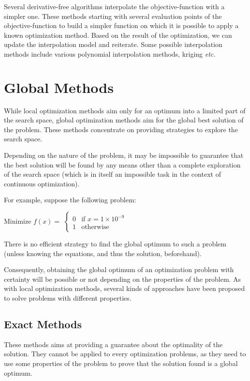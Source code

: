 Several derivative-free algorithms interpolate the objective-function with a simpler one. These methods starting with several evaluation points of the objective-function to build a simpler function on which it is possible to apply a known optimization method. Based on the result of the optimization, we can update the interpolation model and reiterate. Some possible interpolation methods include various polynomial interpolation methods, kriging \emph{etc.}

\section{Global Methods}

While local optimization methods aim only for an optimum into a limited part of the search space, global optimization methods aim for the global best solution of the problem. These methods concentrate on providing strategies to explore the search space.

Depending on the nature of the problem, it may be impossible to guarantee that the best solution will be found by any means other than a complete exploration of the search space (which is in itself an impossible task in the context of continuous optimization).

For example, suppose the following problem:

Minimize $f(x) =$ $\begin{cases}
 		 					0& \text{if } x = 1 \times 10^{-9}\\
 		 					1& \text{otherwise}
 		 			\end{cases}$
 		 			
There is no efficient strategy to find the global optimum to such a problem (unless knowing the equations, and thus the solution, beforehand).

Consequently, obtaining the global optimum of an optimization problem with certainty will be possible or not depending on the properties of the problem.
As with local optimization methods, several kinds of approaches have been proposed to solve problems with different properties.

\subsection{Exact Methods}

These methods aims at providing a guarantee about the optimality of the solution. They cannot be applied to every optimization problems, as they need to use some properties of the problem to prove that the solution found is a global optimum.

